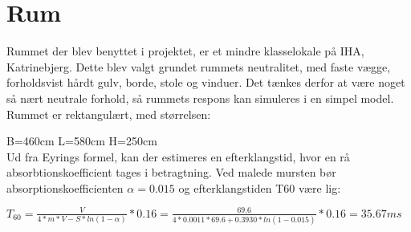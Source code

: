 \section{Rum}

Rummet der blev benyttet i projektet, er et mindre klasselokale på IHA, Katrinebjerg. 
Dette blev valgt grundet rummets neutralitet, med faste vægge, forholdsvist hårdt gulv, borde, stole og vinduer. Det tænkes derfor at være noget så nært neutrale forhold, så rummets respons kan simuleres i en simpel model. \\

Rummet er rektangulært, med størrelsen:

B=460cm \hspace{3cm}
L=580cm \hspace{3cm}
H=250cm\\

Ud fra Eyrings formel, kan der estimeres en efterklangstid, hvor en rå absorbtionskoefficient tages i betragtning. 
Ved malede mursten bør absorptionskoefficienten $\alpha=0.015$ \cite{Attenuation} og efterklangstiden T60 være lig:

\(T_{60}=\frac{V}{4*m*V-S*ln(1-\alpha)}*0.16=\frac{69.6}{4*0.0011* 69.6+0.3930*ln(1-0.015)}*0.16=35.67 ms\)


